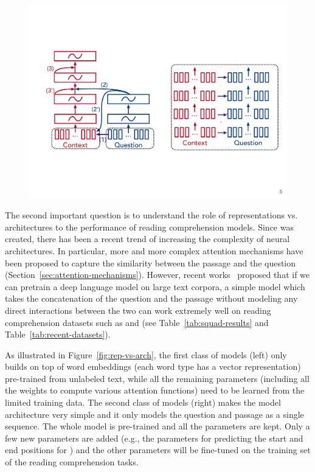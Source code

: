 \begin{figure}[!t]
    \center
    \includegraphics[scale=0.45]{img/rep_vs_arch.pdf}
\end{figure}

The second important question is to understand the role of representations vs. architectures to the performance of reading comprehension models. Since  was created, there has been a recent trend of increasing the complexity of neural architectures. In particular, more and more complex attention mechanisms have been proposed to capture the similarity between the passage and the question (Section~\ref{sec:attention-mechanisms}). However, recent works~\cite{radford2018improving,devlin2018bert} proposed that if we can pretrain a deep language model on large text corpora, a simple model which takes the concatenation of the question and the passage without modeling any direct interactions between the two can work extremely well on reading comprehension datasets such as  and  (see Table~\ref{tab:squad-results} and Table~\ref{tab:recent-datasets}).

As illustrated in Figure~\ref{fig:rep-vs-arch}, the first class of models (left) only builds on top of word embeddings (each word type has a vector representation) pre-trained from unlabeled text, while all the remaining parameters (including all the weights to compute various attention functions) need to be learned from the limited training data. The second class of models (right) makes the model architecture very simple and it only models the question and passage as a single sequence. The whole model is pre-trained and all the parameters are kept. Only a few new parameters are added (e.g., the parameters for predicting the start and end positions for ) and the other parameters will be fine-tuned on the training set of the reading comprehension tasks.

